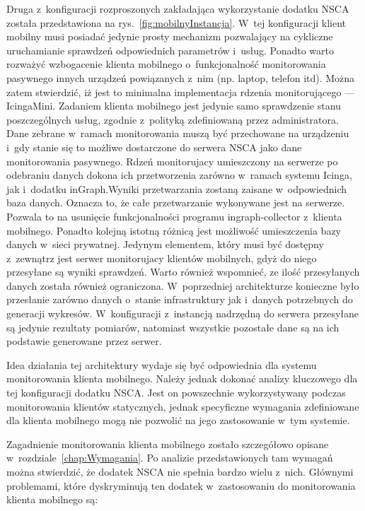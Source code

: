 Druga z~konfiguracji rozproszonych zakładająca wykorzystanie dodatku
NSCA została przedstawiona na rys.~\ref{fig:mobilnyInstancja}. W~tej
konfiguracji klient mobilny musi posiadać jedynie prosty mechanizm
pozwalający na cykliczne uruchamianie sprawdzeń odpowiednich
parametrów i~usług. Ponadto warto rozważyć wzbogacenie klienta
mobilnego o~funkcjonalność monitorowania pasywnego innych urządzeń
powiązanych z~nim (np. laptop, telefon itd). Można zatem stwierdzić,
iż jest to minimalna implementacja rdzenia monitorującego ---
IcingaMini. Zadaniem klienta mobilnego jest jedynie samo sprawdzenie
stanu poszczególnych usług, zgodnie z~polityką zdefiniowaną przez
administratora. Dane zebrane w~ramach monitorowania muszą być
przechowane na urządzeniu i~gdy stanie się to możliwe dostarczone do
serwera NSCA jako dane monitorowania pasywnego. Rdzeń monitorujacy
umieszczony na serwerze po odebraniu danych dokona ich przetworzenia
zarówno w~ramach systemu Icinga, jak i~dodatku inGraph.Wyniki
przetwarzania zostaną zaisane w~odpowiednich baza danych. Oznacza to,
że całe przetwarzanie wykonywane jest na serwerze. Pozwala to na
usunięcie funkcjonalności programu ingraph-collector z~klienta
mobilnego. Ponadto kolejną istotną różnicą jest możliwość umieszczenia
bazy danych w~sieci prywatnej. Jedynym elementem, który musi być
dostępny z~zewnątrz jest serwer monitorujacy klientów mobilnych, gdyż
do niego przesyłane są wyniki sprawdzeń. Warto również wspomnieć, ze
ilość przesyłanych danych została również ograniczona. W~poprzedniej
architekturze konieczne było przesłanie zarówno danych o~stanie
infrastruktury jak i~danych potrzebnych do generacji
wykresów. W~konfiguracji z~instancją nadrzędną do serwera przesyłane
są jedynie rezultaty pomiarów, natomiast wszystkie pozostałe dane są
na ich podstawie generowane przez serwer.

Idea działania tej architektury wydaje się być odpowiednia dla systemu
monitorowania klienta mobilnego. Należy jednak dokonać analizy
kluczowego dla tej konfiguracji dodatku NSCA. Jest on powszechnie
wykorzystywany podczas monitorowania klientów statycznych, jednak
specyficzne wymagania zdefiniowane dla klienta mobilnego mogą nie
pozwolić na jego zastosowanie w~tym systemie.

Zagadnienie monitorowania klienta mobilnego zostało szczegółowo
opisane w~rozdziale~\ref{chap:Wymagania}. Po analizie przedstawionych
tam wymagań można stwierdzić, że dodatek NSCA nie spełnia bardzo wielu
z~nich. Głównymi problemami, które dyskryminują ten dodatek
w~zastosowaniu do monitorowania klienta mobilnego są:

